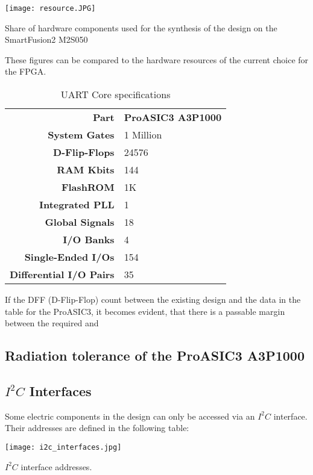 \begin{table}[H]
	\centering
    \texttt{[image: resource.JPG]}
    \caption[Components]{Share of hardware components used for the synthesis of the design on the SmartFusion2 M2S050}
	\label{tab:resource}
\end{table}

These figures can be compared to the hardware resources of the current choice for the FPGA.

\begin{table}[H]

\caption[]{UART Core specifications \cite{Actel}}
    \label{tab:11}
    
  \begin{center}  
  \begin{tabular}{|r|l|}
  \hline
  \textbf{Part}  & \textbf{ProASIC3 A3P1000} \\ \cline{1-2}
  
  \textbf{System Gates} & 1 Million \\
  \textbf{D-Flip-Flops} & 24576\\ 
  \textbf{RAM Kbits} & 144 \\
  \textbf{FlashROM} & 1K\\
  \textbf{Integrated PLL} & 1 \\
  \textbf{Global Signals} & 18 \\
  \textbf{I/O Banks} & 4 \\
  \textbf{Single-Ended I/Os} & 154 \\
  \textbf{Differential I/O Pairs} & 35 \\
  \hline
  
\end{tabular}
\end{center}
\end{table}

If the DFF (D-Flip-Flop) count between the existing design and the data in the table for the ProASIC3, it becomes evident, that there is a passable margin between the required and 


\subsection{Radiation tolerance of the ProASIC3 A3P1000}

\subsection{\texorpdfstring{$I^2C$}{TEXT} Interfaces}
\label{sec:i2c_interfaces}
Some electric components in the design can only be accessed via an $I^2C$ interface. 
Their addresses are defined in the following table:
\begin{table}[H]
	\centering
    \texttt{[image: i2c\_interfaces.jpg]}
    \caption[$I^2C$ Interfaces]{$I^2C$ interface addresses.}
	\label{tab:i2c_interfaces}
\end{table}
